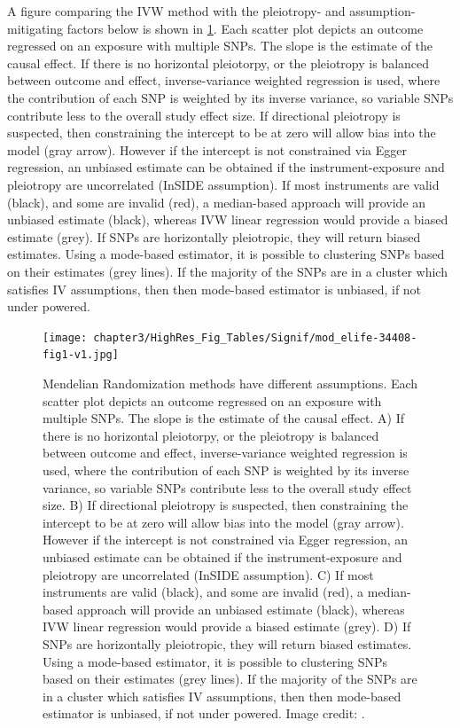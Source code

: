\documentclass[journal,article,submit,moreauthors,pdftex]{Definitions/mdpi}
\begin{document}
A figure comparing the IVW method with the pleiotropy- and assumption-mitigating factors below is shown in \ref{fig:MR_Scatters}.  Each scatter plot depicts an outcome regressed on an exposure with multiple SNPs. The slope is the estimate of the causal effect. If there is no horizontal pleiotorpy, or the pleiotropy is balanced between outcome and effect, inverse-variance weighted regression is used, where the contribution of each SNP is weighted by its inverse variance, so variable SNPs contribute less to the overall study effect size. If directional pleiotropy is suspected, then constraining the intercept to be at zero will allow bias into the model (gray arrow). However if the intercept is not constrained via Egger regression, an unbiased estimate can be obtained if the instrument-exposure and pleiotropy are uncorrelated (InSIDE assumption). If most instruments are valid (black), and some are invalid (red), a median-based approach will provide an unbiased estimate (black), whereas IVW linear regression would provide a biased estimate (grey). If SNPs are horizontally pleiotropic, they will return biased estimates. Using a mode-based estimator, it is possible to clustering SNPs based on their estimates (grey lines). If the majority of the SNPs are in a cluster which satisfies IV assumptions, then then mode-based estimator is unbiased, if not under powered.

\begin{figure}[htbp]
	\centering
	\texttt{[image: chapter3/HighRes\_Fig\_Tables/Signif/mod\_elife-34408-fig1-v1.jpg]}
	\caption[Mendelian Randomization Method Scatter Plots]{Mendelian Randomization methods have different assumptions. Each scatter plot depicts an outcome regressed on an exposure with multiple SNPs. The slope is the estimate of the causal effect. A) If there is no horizontal pleiotorpy, or the pleiotropy is balanced between outcome and effect, inverse-variance weighted regression is used, where the contribution of each SNP is weighted by its inverse variance, so variable SNPs contribute less to the overall study effect size. B) If directional pleiotropy is suspected, then constraining the intercept to be at zero will allow bias into the model (gray arrow). However if the intercept is not constrained via Egger regression, an unbiased estimate can be obtained if the instrument-exposure and pleiotropy are uncorrelated (InSIDE assumption). C) If most instruments are valid (black), and some are invalid (red), a median-based approach will provide an unbiased estimate (black), whereas IVW linear regression would provide a biased estimate (grey). D) If SNPs are horizontally pleiotropic, they will return biased estimates. Using a mode-based estimator, it is possible to clustering SNPs based on their estimates (grey lines). If the majority of the SNPs are in a cluster which satisfies IV assumptions, then then mode-based estimator is unbiased, if not under powered. Image credit: \cite{hemani_evaluating_2018}.}
	\label{fig:MR_Scatters}
\end{figure}
\end{document}
